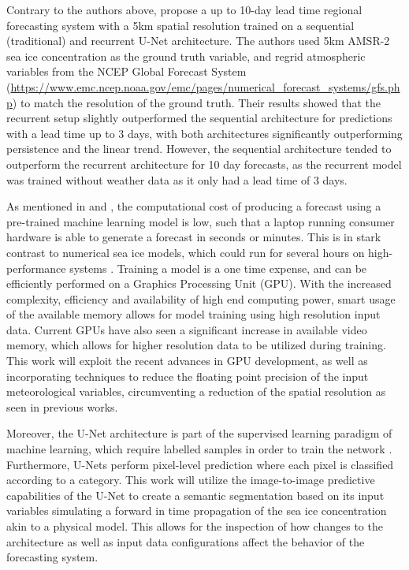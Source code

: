 \documentclass[../main/thesis.tex]{subfiles}
\begin{document}
Contrary to the authors above, \citet{Grigoryev2022} propose a up to 10-day lead time regional forecasting system with a 5km spatial resolution trained on a sequential (traditional) and recurrent U-Net architecture. The authors used 5km AMSR-2 sea ice concentration as the ground truth variable, and regrid atmospheric variables from the NCEP Global Forecast System (\url{https://www.emc.ncep.noaa.gov/emc/pages/numerical_forecast_systems/gfs.php}) to match the resolution of the ground truth. Their results showed that the recurrent setup slightly outperformed the sequential architecture for predictions with a lead time up to 3 days, with both architectures significantly outperforming persistence and the linear trend. However, the sequential architecture tended to outperform the recurrent architecture for 10 day forecasts, as the recurrent model was trained without weather data as it only had a lead time of 3 days.

As mentioned in \citet{Andersson2021} and \citet{Fritzner2020}, the computational cost of producing a forecast using a pre-trained machine learning model is low, such that a laptop running consumer hardware is able to generate a forecast in seconds or minutes. This is in stark contrast to numerical sea ice models, which could run for several hours on high-performance systems \citep{Andersson2021}. Training a model is a one time expense, and can be efficiently performed on a Graphics Processing Unit (GPU). With the increased complexity, efficiency and availability of high end computing power, smart usage of the available memory allows for model training using high resolution input data. Current GPUs have also seen a significant increase in available video memory, which allows for higher resolution data to be utilized during training. This work will exploit the recent advances in GPU development, as well as incorporating techniques to reduce the floating point precision of the input meteorological variables, circumventing a reduction of the spatial resolution as seen in previous works.

Moreover, the U-Net architecture is part of the supervised learning paradigm of machine learning, which require labelled samples in order to train the network \citep{Ronneberger2015}. Furthermore, U-Nets perform pixel-level prediction where each pixel is classified according to a category. This work will utilize the image-to-image predictive capabilities of the U-Net to create a semantic segmentation based on its input variables simulating a forward in time propagation of the sea ice concentration akin to a physical model. This allows for the inspection of how changes to the architecture as well as input data configurations affect the behavior of the forecasting system.
\end{document}

